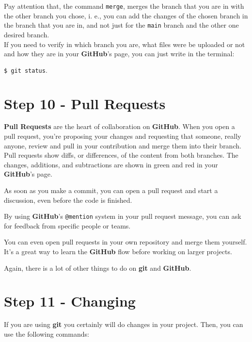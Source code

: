 \documentclass[12pt,a4paper,titlepage,brazil]{article}
\begin{document}
{Pay attention that, the command \texttt{merge}, merges the branch that you are in with the other branch you chose, i. e., you can add the changes of the chosen branch in the branch that you are in, and not just for the \texttt{main} branch and the other one desired branch.\\

If you need to verify in which branch you are, what files were be uploaded or not and how they are in your {\bf GitHub}'s page, you can just write in the terminal:

\texttt{\$ git status}.


\section{Step 10 - Pull Requests}

{\bf Pull Requests} are the heart of collaboration on {\bf GitHub}. When you open a pull request, you’re proposing your changes and requesting that someone, really anyone, review and pull in your contribution and merge them into their branch. Pull requests show diffs, or differences, of the content from both branches. The changes, additions, and subtractions are shown in {\color{green}green} and {\color{red}red} in your {\bf GitHub}'s page.

As soon as you make a commit, you can open a pull request and start a discussion, even before the code is finished.

By using {\bf GitHub}’s \texttt{@mention} system in your pull request message, you can ask for feedback from specific people or teams.

You can even open pull requests in your own repository and merge them yourself. It’s a great way to learn the {\bf GitHub} flow before working on larger projects.

Again, there is a lot of other things to do on {\bf git} and {\bf GitHub}.


\section{Step 11 - Changing}

If you are using {\bf git} you certainly will do changes in your project. Then, you can use the following commands:

}
\end{document}

